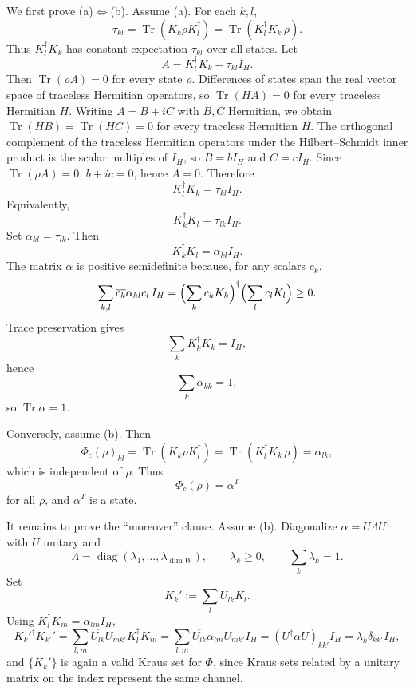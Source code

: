 \documentclass[11pt]{article}
\DeclareMathOperator{\Tr}{Tr}
\DeclareMathOperator{\diag}{diag}
\begin{document}
We first prove (a)$\Leftrightarrow$(b). Assume (a). For each $k,l$,
\[
\tau_{kl}
=
\Tr(K_k\rho K_l^\dagger)
=
\Tr(K_l^\dagger K_k\,\rho).
\]
Thus $K_l^\dagger K_k$ has constant expectation $\tau_{kl}$ over all
states. Let
\[
A=K_l^\dagger K_k-\tau_{kl}I_H.
\]
Then $\Tr(\rho A)=0$ for every state $\rho$. Differences of states span the
real vector space of traceless Hermitian operators, so $\Tr(HA)=0$ for
every traceless Hermitian $H$. Writing $A=B+iC$ with $B,C$ Hermitian, we
obtain $\Tr(HB)=\Tr(HC)=0$ for every traceless Hermitian $H$. The
orthogonal complement of the traceless Hermitian operators under the
Hilbert--Schmidt inner product is the scalar multiples of $I_H$, so
$B=bI_H$ and $C=cI_H$. Since $\Tr(\rho A)=0$, $b+ic=0$, hence $A=0$.
Therefore
\[
K_l^\dagger K_k=\tau_{kl}I_H.
\]
Equivalently,
\[
K_k^\dagger K_l=\tau_{lk}I_H.
\]
Set $\alpha_{kl}=\tau_{lk}$. Then
\[
K_k^\dagger K_l=\alpha_{kl}I_H.
\]
The matrix $\alpha$ is positive semidefinite because, for any scalars
$c_k$,
\[
\sum_{k,l}\overline{c_k}\alpha_{kl}c_l\,I_H
=
\Bigl(\sum_k c_kK_k\Bigr)^\dagger
\Bigl(\sum_l c_lK_l\Bigr)
\ge0.
\]
Trace preservation gives
\[
\sum_k K_k^\dagger K_k=I_H,
\]
hence
\[
\sum_k\alpha_{kk}=1,
\]
so $\Tr\alpha=1$.

Conversely, assume (b). Then
\[
\Phi_c(\rho)_{kl}
=
\Tr(K_k\rho K_l^\dagger)
=
\Tr(K_l^\dagger K_k\,\rho)
=
\alpha_{lk},
\]
which is independent of $\rho$. Thus
\[
\Phi_c(\rho)=\alpha^T
\]
for all $\rho$, and $\alpha^T$ is a state.

It remains to prove the ``moreover'' clause. Assume (b). Diagonalize
$\alpha=U\Lambda U^\dagger$ with $U$ unitary and
\[
\Lambda=\diag(\lambda_1,\dots,\lambda_{\dim W}),
\qquad
\lambda_k\ge0,
\qquad
\sum_k\lambda_k=1.
\]
Set
\[
K_k':=\sum_l U_{lk}K_l.
\]
Using $K_l^\dagger K_m=\alpha_{lm}I_H$,
\[
K_k'^\dagger K_{k'}'
=
\sum_{l,m}\overline{U_{lk}}U_{mk'}K_l^\dagger K_m
=
\sum_{l,m}\overline{U_{lk}}\alpha_{lm}U_{mk'}I_H
=
(U^\dagger\alpha U)_{kk'}I_H
=
\lambda_k\delta_{kk'}I_H,
\]
and $\{K_k'\}$ is again a valid Kraus set for $\Phi$, since Kraus sets
related by a unitary matrix on the index represent the same channel.
\end{document}
